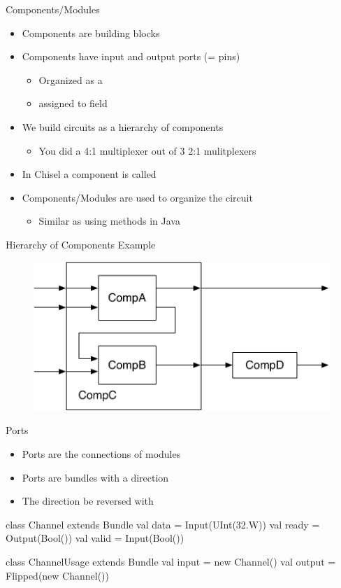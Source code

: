 \begin{frame}[fragile]{Components/Modules}
\begin{itemize}
\item Components are building blocks
\item Components have input and output ports (= pins)
\begin{itemize}
\item Organized as a 
\item assigned to field 
\end{itemize}
\item We build circuits as a hierarchy of components
\begin{itemize}
\item You did a 4:1 multiplexer out of 3 2:1 mulitplexers
\end{itemize}
\item In Chisel a component is called 
\item Components/Modules are used to organize the circuit
\begin{itemize}
\item Similar as using methods in Java
\end{itemize}
\end{itemize}
\end{frame}

\begin{frame}[fragile]{Hierarchy of Components Example}
\begin{figure}
  \includegraphics[scale=\scale]{../figures/components}
\end{figure}
\end{frame}


\begin{frame}[fragile]{Ports}
\begin{itemize}
\item Ports are the connections of modules
\item Ports are bundles with a direction
\item The direction be reversed with 
\end{itemize}
\begin{chisel}
class Channel extends Bundle {
  val data = Input(UInt(32.W))
  val ready = Output(Bool())
  val valid = Input(Bool())
}

class ChannelUsage extends Bundle {
  val input = new Channel()
  val output = Flipped(new Channel())
}
\end{chisel}
\end{frame}

